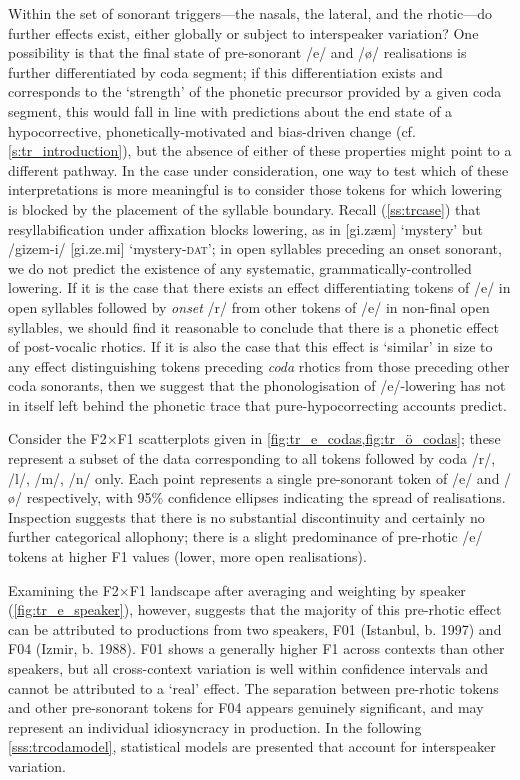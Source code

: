Within the set of sonorant triggers---the nasals, the lateral, and the rhotic---do further effects exist, either globally or subject to interspeaker variation? One possibility is that the final state of pre-sonorant /e/ and /\o/ realisations is further differentiated by coda segment; if this differentiation exists and corresponds to the `strength' of the phonetic precursor provided by a given coda segment, this would fall in line with predictions about the end state of a hypocorrective, phonetically-motivated and bias-driven change (cf. \cref{s:tr_introduction}), but the absence of either of these properties might point to a different pathway. In the case under consideration, one way to test which of these interpretations is more meaningful is to consider those tokens for which lowering is blocked by the placement of the syllable boundary. Recall (\cref{ss:trcase}) that resyllabification under affixation blocks lowering, as in [gi.zæm] `mystery' but /gizem-i/ [gi.ze.mi] `mystery-\textsc{\footnotesize dat}'; in open syllables preceding an onset sonorant, we do not predict the existence of any systematic, grammatically-controlled lowering. If it is the case that there exists an effect differentiating tokens of /e/ in open syllables followed by \emph{onset} /r/ from other tokens of /e/ in non-final open syllables, we should find it reasonable to conclude that there is a phonetic effect of post-vocalic rhotics. If it is also the case that this effect is `similar' in size to any effect distinguishing tokens preceding \emph{coda} rhotics from those preceding other coda sonorants, then we suggest that the phonologisation of /e/-lowering has not in itself left behind the phonetic trace that pure-hypocorrecting accounts predict.

Consider the F2$\times$F1 scatterplots given in \cref{fig:tr_e_codas,fig:tr_ö_codas}; these represent a subset of the data corresponding to all tokens followed by coda /r/, /l/, /m/, /n/ only. Each point represents a single pre-sonorant token of /e/ and /\o/ respectively, with 95\% confidence ellipses indicating the spread of realisations. Inspection suggests that there is no substantial discontinuity and certainly no further categorical allophony; there is a slight predominance of pre-rhotic /e/ tokens at higher F1 values (lower, more open realisations).

Examining the F2$\times$F1 landscape after averaging and weighting by speaker (\cref{fig:tr_e_speaker}), however, suggests that the majority of this pre-rhotic effect can be attributed to productions from two speakers, F01 (Istanbul, b. 1997) and F04 (Izmir, b. 1988). F01 shows a generally higher F1 across contexts than other speakers, but all cross-context variation is well within confidence intervals and cannot be attributed to a `real' effect. The separation between pre-rhotic tokens and other pre-sonorant tokens for F04 appears genuinely significant, and may represent an individual idiosyncracy in production. In the following \cref{sss:trcodamodel}, statistical models are presented that account for interspeaker variation.

